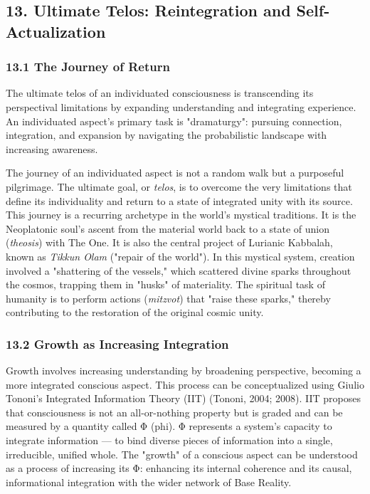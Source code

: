 \subsection*{13. Ultimate Telos: Reintegration and Self-Actualization}


\subsubsection*{13.1 The Journey of Return}


The ultimate telos of an individuated consciousness is transcending its perspectival limitations by expanding understanding and integrating experience. An individuated aspect's primary task is "dramaturgy": pursuing connection, integration, and expansion by navigating the probabilistic landscape with increasing awareness.


The journey of an individuated aspect is not a random walk but a purposeful pilgrimage. The ultimate goal, or \textit{telos}, is to overcome the very limitations that define its individuality and return to a state of integrated unity with its source. This journey is a recurring archetype in the world's mystical traditions. It is the Neoplatonic soul's ascent from the material world back to a state of union (\textit{theosis}) with The One. It is also the central project of Lurianic Kabbalah, known as \textit{Tikkun Olam} ("repair of the world"). In this mystical system, creation involved a "shattering of the vessels," which scattered divine sparks throughout the cosmos, trapping them in "husks" of materiality. The spiritual task of humanity is to perform actions (\textit{mitzvot}) that "raise these sparks," thereby contributing to the restoration of the original cosmic unity.


\subsubsection*{13.2 Growth as Increasing Integration}


Growth involves increasing understanding by broadening perspective, becoming a more integrated conscious aspect. This process can be conceptualized using Giulio Tononi's Integrated Information Theory (IIT) (Tononi, 2004; 2008). IIT proposes that consciousness is not an all-or-nothing property but is graded and can be measured by a quantity called Φ (phi). Φ represents a system's capacity to integrate information — to bind diverse pieces of information into a single, irreducible, unified whole. The "growth" of a conscious aspect can be understood as a process of increasing its Φ: enhancing its internal coherence and its causal, informational integration with the wider network of Base Reality.


